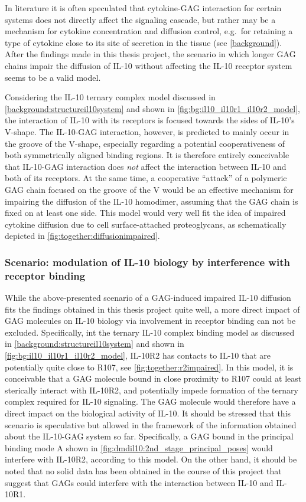 In literature it is often speculated that cytokine-GAG interaction for certain
systems does not directly affect the signaling cascade, but rather may be a
mechanism for cytokine concentration and diffusion control, e.g.\ for retaining
a type of cytokine close to its site of secretion in the tissue (see
\cref{background}). After the findings made in this thesis project, the scenario
in which longer GAG chains impair the diffusion of IL-10 without affecting the
IL-10 receptor system seems to be a valid model.

Considering the IL-10 ternary complex model discussed in
\cref{background:structureil10system} and shown in
\cref{fig:bg:il10_il10r1_il10r2_model}, the interaction of IL-10 with its
receptors is focused towards the sides of IL-10's V-shape. The IL-10-GAG
interaction, however, is predicted to mainly occur in the groove of the V-shape,
especially regarding a potential cooperativeness of both symmetrically aligned
binding regions. It is therefore entirely conceivable that IL-10-GAG interaction
does \textit{not} affect the interaction between IL-10 and both of its
receptors. At the same time, a cooperative \enquote{attack} of a polymeric GAG
chain focused on the groove of the V would be an effective mechanism for
impairing the diffusion of the IL-10 homodimer, assuming that the GAG chain is
fixed on at least one side. This model would very well fit the idea of impaired
cytokine diffusion due to cell surface-attached proteoglycans, as schematically
depicted in \cref{fig:together:diffusionimpaired}.


\subsubsection{Scenario: modulation of IL-10 biology by interference with
receptor binding}

While the above-presented scenario of a GAG-induced impaired IL-10 diffusion
fits the findings obtained in this thesis project quite well, a more direct
impact of GAG molecules on IL-10 biology via involvement in receptor binding can
not be excluded. Specifically, int the ternary IL-10 complex binding model as
discussed in \cref{background:structureil10system} and shown in
\cref{fig:bg:il10_il10r1_il10r2_model}, IL-10R2 has contacts to IL-10 that
are potentially quite close to R107, see \cref{fig:together:r2impaired}. In this
model, it is conceivable that a GAG molecule bound in close proximity to R107
could at least sterically interact with IL-10R2, and potentially impede
formation of the ternary complex required for IL-10 signaling. The GAG molecule
would therefore have a direct impact on the biological activity of IL-10. It
should be stressed that this scenario is speculative but allowed in the
framework of the information obtained about the IL-10-GAG system so far.
Specifically, a GAG bound in the principal binding mode A shown in
\cref{fig:dmdil10:2nd_stage_principal_poses} would interfere with IL-10R2,
according to this model. On the other hand, it should be noted that no solid
data has been obtained in the course of this project that suggest that GAGs
could interfere with the interaction between IL-10 and IL-10R1.

